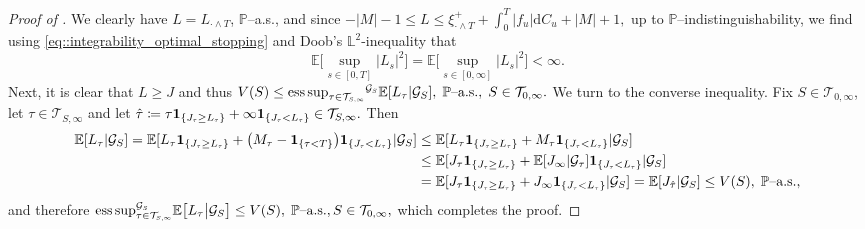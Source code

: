 \documentclass[10pt]{article} %
\newcommand\cG{\mathcal G}
\newcommand\cT{\mathcal T}
\newcommand{\smalltext}[1]{\text{\fontsize{4}{4}\selectfont$#1$}}
\def \E{\mathbb{E}}
\def \L{\mathbb{L}}
\def \P{\mathbb{P}}
\newcommand{\1}{\mathbf{1}}
\def\d{\mathrm{d}}
\DeclareMathOperator*{\esssup}{ess\,sup}
\begin{document}
\begin{proof}[Proof of ]
	We clearly have $L = L_{\cdot \land T}$, $\P$--a.s., and since $-|M| - 1 \leq L \leq \xi_{\cdot \land T}^+ + \int_0^T |f_u| \d C_u + |M| + 1,$ up to $\P$--indistinguishability, we find using \eqref{eq::integrability_optimal_stopping} and Doob's $\L^2$-inequality that
	\begin{equation*}
		\E\bigg[\sup_{s \in [0,T]} |L_s|^2\bigg] = \E\bigg[\sup_{s \in [0,\infty]} |L_s|^2\bigg] < \infty.
	\end{equation*}
	Next, it is clear that $L \geq J$ and thus $V(S) \leq {\esssup_{\tau \in \cT_{\smalltext{S}\smalltext{,}\smalltext{\infty}}}}^{\cG_\smalltext{S}} \E[L_\tau |\cG_S], \; \text{$\P$--a.s.}, \; S \in \cT_{0,\infty}.$ We turn to the converse inequality. Fix $S \in \cT_{0,\infty}$, let $\tau \in \cT_{S,\infty}$ and let $\hat\tau \coloneqq \tau \mathbf{1}_{\{J_\smalltext{\tau} \geq L_\smalltext{\tau}\}} + \infty \mathbf{1}_{\{J_\smalltext{\tau} < L_\smalltext{\tau}\}} \in \cT_{S,\infty}.$ Then
	\begin{align*}
		\E[L_{\tau}| \cG_S] = \E[L_{\tau} \mathbf{1}_{\{J_\smalltext{\tau} \geq L_\smalltext{\tau}\}} + \big(M_\tau - \mathbf{1}_{\{\tau < T\}}\big)\mathbf{1}_{\{J_\smalltext{\tau} < L_\smalltext{\tau}\}}| \cG_S]  
		&\leq \E[L_\tau \mathbf{1}_{\{J_\smalltext{\tau} \geq L_\smalltext{\tau}\}} + M_\tau\mathbf{1}_{\{J_\smalltext{\tau} < L_\smalltext{\tau}\}}| \cG_S] \\
		&\leq \E[J_\tau \mathbf{1}_{\{J_\smalltext{\tau} \geq L_\smalltext{\tau}\}} + \E[J_\infty | \cG_\tau]\mathbf{1}_{\{J_\smalltext{\tau} < L_\smalltext{\tau}\}}| \cG_S] \\
		&= \E[J_\tau \mathbf{1}_{\{J_\smalltext{\tau} \geq L_\smalltext{\tau}\}} + J_\infty\mathbf{1}_{\{J_\smalltext{\tau} < L_\smalltext{\tau}\}}| \cG_S] = \E[J_{\hat\tau}| \cG_S] \leq V(S), \; \text{$\P$--a.s.},
	\end{align*}
	and therefore ${\esssup^{\cG_\smalltext{S}}_{\tau \in \cT_{\smalltext{S}\smalltext{,}\smalltext{\infty}}}} \E\big[ L_\tau \big| \cG_S\big] \leq V(S), \; \text{$\P$--a.s.}, S \in \cT_{0,\infty},$ which completes the proof.
\end{proof}
\end{document}
